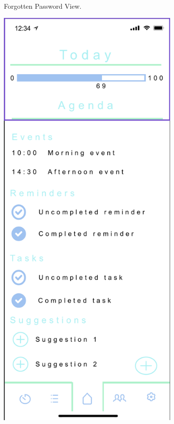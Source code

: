 \begin{figure}[H]
\begin{subfigure}[b]{0.3\textwidth}
        \caption{Forgotten Password View.}
        \label{fig:forgotten_password_colour}
    \end{subfigure}
    \hfill
    \begin{subfigure}[b]{0.3\textwidth}
        \centering
        \includegraphics[width=\textwidth]{./graphics/design/Dashboard - Agenda View - Today.png}

\end{subfigure}
\end{figure}
